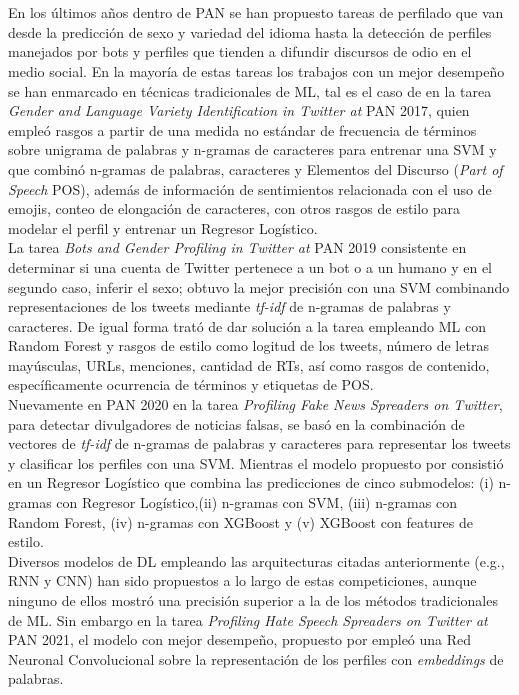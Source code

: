  \\
 \\
 En los últimos años dentro de PAN se han propuesto tareas de perfilado que van desde la predicción de sexo y variedad del idioma  hasta la detección de perfiles manejados por bots y perfiles que tienden a difundir discursos de odio en el medio social. En la mayoría de estas tareas los trabajos con un mejor desempeño se han enmarcado en técnicas tradicionales de ML, tal es el caso de \citep{basile:2017} en la tarea \textit{Gender and Language Variety Identification in Twitter at} PAN 2017, quien empleó rasgos a partir de una medida no estándar de frecuencia de términos sobre unigrama de palabras y n-gramas de caracteres para entrenar una SVM y \citep{martinc:2017}  que combinó n-gramas de palabras, caracteres y Elementos del Discurso (\textit{Part of Speech} POS), además de información de sentimientos relacionada con el uso de emojis, conteo de elongación de caracteres, con otros rasgos de estilo para modelar el perfil y entrenar un Regresor Logístico. 
 \\
 La tarea \textit{Bots and Gender Profiling in Twitter at} PAN 2019 consistente en determinar si una cuenta de Twitter pertenece a un bot o a un humano y en el segundo caso, inferir el sexo; \citep{DBLP:conf/clef/Pizarro19} obtuvo la mejor precisión con una SVM combinando representaciones de los tweets mediante \textit{tf-idf} de n-gramas de palabras y caracteres. De igual forma \citep{DBLP:conf/clef/Johansson19} trató de dar solución a la tarea empleando ML con Random Forest y rasgos de estilo como logitud de los tweets, número de letras mayúsculas, URLs, menciones, cantidad de RTs, así como rasgos de contenido, específicamente ocurrencia de términos y etiquetas de POS.
 \\ 
 Nuevamente en PAN 2020 en la tarea \textit{Profiling Fake News Spreaders on Twitter}, para detectar divulgadores de noticias falsas, \citep{pizarro:2020} se basó en la combinación de vectores de \textit{tf-idf} de n-gramas de palabras y caracteres para representar los tweets y clasificar los perfiles con una SVM. Mientras el modelo propuesto por \citep{buda:2020} consistió en un Regresor Logístico que combina las predicciones de cinco submodelos: (i) n-gramas con Regresor Logístico,(ii) n-gramas con SVM, (iii) n-gramas con Random Forest, (iv) n-gramas con XGBoost y (v) XGBoost con features de estilo.
 \\
Diversos modelos de DL empleando las arquitecturas citadas anteriormente (e.g., RNN y CNN) han sido propuestos a lo largo de estas competiciones, aunque ninguno de ellos mostró una precisión superior a la de los métodos tradicionales de ML. Sin embargo en la tarea \textit{Profiling Hate Speech Spreaders on Twitter at} PAN 2021, el modelo con mejor desempeño, propuesto por \citep{sinno:2021} empleó una Red Neuronal Convolucional sobre la representación de los perfiles con \textit{embeddings} de palabras. 

